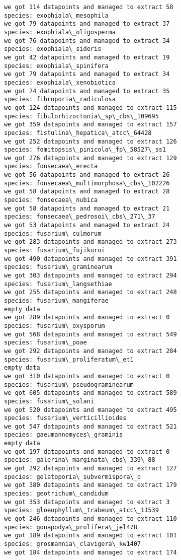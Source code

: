 \documentclass[11pt]{article}
\begin{document}
\begin{Verbatim}[commandchars=\\\{\}]
we got 114 datapoints and managed to extract 58
species: exophiala\_mesophila
we got 79 datapoints and managed to extract 37
species: exophiala\_oligosperma
we got 76 datapoints and managed to extract 34
species: exophiala\_sideris
we got 42 datapoints and managed to extract 19
species: exophiala\_spinifera
we got 79 datapoints and managed to extract 34
species: exophiala\_xenobiotica
we got 74 datapoints and managed to extract 35
species: fibroporia\_radiculosa
we got 124 datapoints and managed to extract 115
species: fibulorhizoctonia\_sp\_cbs\_109695
we got 359 datapoints and managed to extract 157
species: fistulina\_hepatica\_atcc\_64428
we got 252 datapoints and managed to extract 126
species: fomitopsis\_pinicola\_fp\_58527\_ss1
we got 276 datapoints and managed to extract 129
species: fonsecaea\_erecta
we got 56 datapoints and managed to extract 26
species: fonsecaea\_multimorphosa\_cbs\_102226
we got 58 datapoints and managed to extract 28
species: fonsecaea\_nubica
we got 58 datapoints and managed to extract 21
species: fonsecaea\_pedrosoi\_cbs\_271\_37
we got 53 datapoints and managed to extract 24
species: fusarium\_culmorum
we got 283 datapoints and managed to extract 273
species: fusarium\_fujikuroi
we got 490 datapoints and managed to extract 391
species: fusarium\_graminearum
we got 303 datapoints and managed to extract 294
species: fusarium\_langsethiae
we got 255 datapoints and managed to extract 248
species: fusarium\_mangiferae
empty data
we got 289 datapoints and managed to extract 0
species: fusarium\_oxysporum
we got 568 datapoints and managed to extract 549
species: fusarium\_poae
we got 292 datapoints and managed to extract 284
species: fusarium\_proliferatum\_et1
empty data
we got 310 datapoints and managed to extract 0
species: fusarium\_pseudograminearum
we got 605 datapoints and managed to extract 589
species: fusarium\_solani
we got 520 datapoints and managed to extract 495
species: fusarium\_verticillioides
we got 547 datapoints and managed to extract 521
species: gaeumannomyces\_graminis
empty data
we got 197 datapoints and managed to extract 0
species: galerina\_marginata\_cbs\_339\_88
we got 292 datapoints and managed to extract 127
species: gelatoporia\_subvermispora\_b
we got 380 datapoints and managed to extract 179
species: geotrichum\_candidum
we got 353 datapoints and managed to extract 3
species: gloeophyllum\_trabeum\_atcc\_11539
we got 246 datapoints and managed to extract 110
species: gonapodya\_prolifera\_jel478
we got 189 datapoints and managed to extract 101
species: grosmannia\_clavigera\_kw1407
we got 184 datapoints and managed to extract 174

\end{Verbatim}
\end{document}
